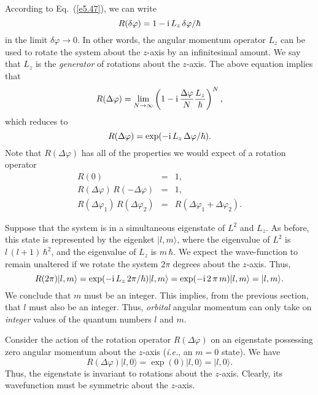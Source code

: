 According to Eq.~(\ref{e5.47}), we can write
\begin{equation}
R(\delta \varphi) = 1 -{\rm i}\,L_z\,\delta\varphi/\hbar
\end{equation}
in the limit $\delta\varphi\rightarrow 0$. In other words, the angular momentum 
operator $L_z$
can be used to rotate the system about the $z$-axis by an infinitesimal amount.
We say that $L_z$ is the {\em generator} of rotations about the $z$-axis. 
The above equation implies that 
\begin{equation}
R(\Delta\varphi) = \lim_{N\rightarrow\infty} \left(1-{\rm i} \,\frac{\Delta
\varphi}{N} \frac{L_z}{\hbar}\right)^N,
\end{equation}
which reduces to
\begin{equation}\label{e5.50}
R(\Delta\varphi) = \exp(-{\rm i}\,L_z \,\Delta\varphi/\hbar).
\end{equation}
Note that $R(\Delta\varphi)$ has all of the properties we would expect of
a rotation operator
\begin{eqnarray}
R(0) &=& 1,\\[0.5ex]
R(\Delta\varphi)\,R(-\Delta\varphi) &=& 1,\\[0.5ex]
R(\Delta\varphi_1)\,R(\Delta\varphi_2)& =& R(\Delta\varphi_1+ \Delta\varphi_2).
\end{eqnarray}

Suppose that the system is in a simultaneous eigenstate of $L^2$ and $L_z$. 
As before, this state is represented by the eigenket $|l,m\rangle$, where
the eigenvalue of $L^2$ is $l\,(l+1)\,\hbar^2$, and
the eigenvalue of $L_z$ is $m\,\hbar$.  We expect the wave-function
 to remain unaltered  if we rotate
the system $2\pi$ degrees about the $z$-axis. Thus,
\begin{equation}
R(2\pi)|l,m\rangle = \exp(-{\rm i}\,L_z \,2\pi/\hbar)|l,m\rangle 
= \exp(-{\rm i}\, 2\,\pi\,m) |l,m\rangle = |l,m\rangle.
\end{equation}
We conclude that $m$ must be an integer. This implies, from the previous
section, that $l$ must also be an integer. Thus, {\em orbital} angular momentum
can only take on {\em integer} values of the quantum numbers $l$ and $m$. 

Consider the action of the rotation operator $R(\Delta\varphi)$ on an eigenstate
possessing zero angular momentum about the $z$-axis ({\em i.e.}, an $m=0$
state). We have
\begin{equation}
R(\Delta\varphi)|l, 0\rangle =  \exp(0)| l, 0\rangle = |l, 0\rangle.
\end{equation}
Thus, the eigenstate is invariant to rotations about the $z$-axis. Clearly,
its wavefunction must be symmetric about the $z$-axis. 

